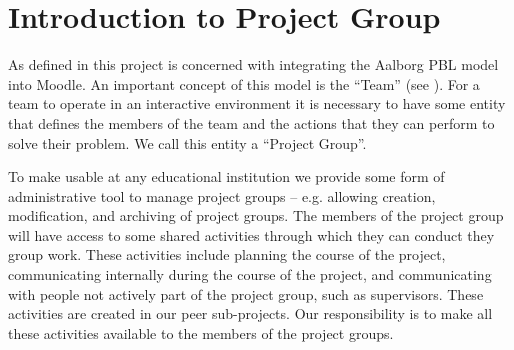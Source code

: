 \chapter{Introduction to Project Group}
\label{chap:introProjectgroup}

As defined in  this project is concerned with integrating the Aalborg PBL model into Moodle.
An important concept of this model is the ``Team'' (see ).
For a team to operate in an interactive environment it is necessary to have some entity that defines the members of the team and the actions that they can perform to solve their problem.
We call this entity a ``Project Group''.

To make \system{} usable at any educational institution we provide some form of administrative tool to manage project groups -- e.g. allowing  creation, modification, and archiving of project groups.
The members of the project group will have access to some shared activities through which they can conduct they group work.
These activities include planning the course of the project, communicating internally during the course of the project, and communicating with people not actively part of the project group, such as supervisors.
These activities are created in our peer sub-projects.
Our responsibility is to make all these activities available to the members of the project groups.
	

